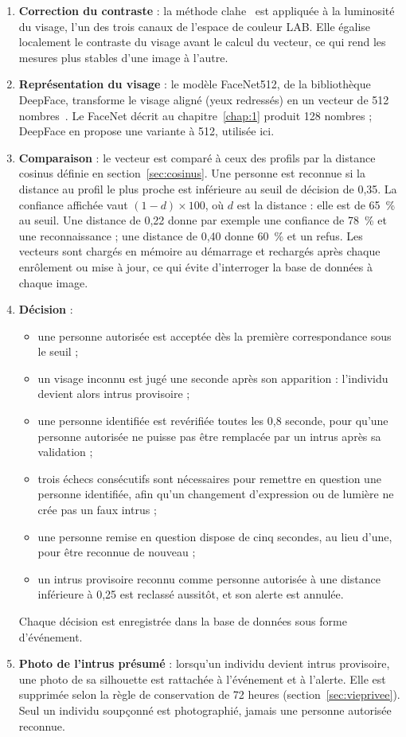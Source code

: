 \begin{maj}
\begin{enumerate}
  \item \textbf{Correction du contraste} : la méthode \gls{clahe}~\cite{zuiderveld1994clahe,opencv_clahe} est appliquée à la luminosité du visage, l'un des trois canaux de l'espace de couleur LAB. Elle égalise localement le contraste du visage avant le calcul du vecteur, ce qui rend les mesures plus stables d'une image à l'autre.
  \item \textbf{Représentation du visage} : le modèle FaceNet512, de la bibliothèque DeepFace, transforme le visage aligné (yeux redressés) en un vecteur de 512 nombres~\cite{schroff2015facenet,serengil2020lightface}. Le FaceNet décrit au chapitre~\ref{chap:1} produit 128 nombres ; DeepFace en propose une variante à 512, utilisée ici.
  \item \textbf{Comparaison} : le vecteur est comparé à ceux des profils par la distance cosinus définie en section~\ref{sec:cosinus}. Une personne est reconnue si la distance au profil le plus proche est inférieure au seuil de décision de 0,35. La confiance affichée vaut $(1 - d) \times 100$, où $d$ est la distance : elle est de 65~\% au seuil. Une distance de 0,22 donne par exemple une confiance de 78~\% et une reconnaissance ; une distance de 0,40 donne 60~\% et un refus. Les vecteurs sont chargés en mémoire au démarrage et rechargés après chaque enrôlement ou mise à jour, ce qui évite d'interroger la base de données à chaque image.
  \item \textbf{Décision} :
    \begin{itemize}
      \item une personne autorisée est acceptée dès la première correspondance sous le seuil ;
      \item un visage inconnu est jugé une seconde après son apparition : l'individu devient alors intrus provisoire ;
      \item une personne identifiée est revérifiée toutes les 0,8 seconde, pour qu'une personne autorisée ne puisse pas être remplacée par un intrus après sa validation ;
      \item trois échecs consécutifs sont nécessaires pour remettre en question une personne identifiée, afin qu'un changement d'expression ou de lumière ne crée pas un faux intrus ;
      \item une personne remise en question dispose de cinq secondes, au lieu d'une, pour être reconnue de nouveau ;
      \item un intrus provisoire reconnu comme personne autorisée à une distance inférieure à 0,25 est reclassé aussitôt, et son alerte est annulée.
    \end{itemize}
    Chaque décision est enregistrée dans la base de données sous forme d'événement.
  \item \textbf{Photo de l'intrus présumé} : lorsqu'un individu devient intrus provisoire, une photo de sa silhouette est rattachée à l'événement et à l'alerte. Elle est supprimée selon la règle de conservation de 72 heures (section~\ref{sec:vieprivee}). Seul un individu soupçonné est photographié, jamais une personne autorisée reconnue.
\end{enumerate}


\end{maj}
